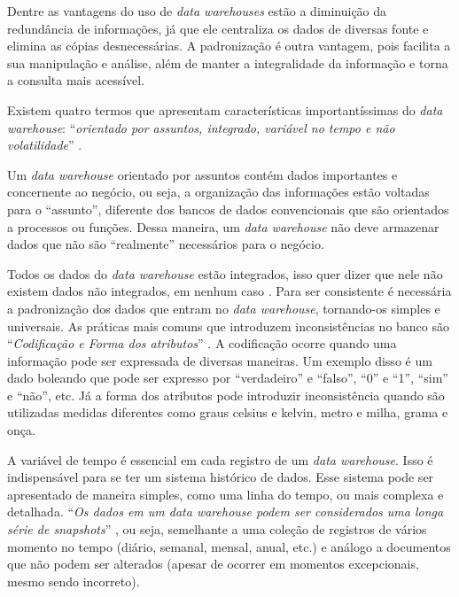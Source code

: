 Dentre as vantagens do uso de \textit{data warehouses} estão a diminuição da redundância de informações, já que ele centraliza os dados de diversas fonte e elimina as cópias desnecessárias. A padronização é outra vantagem, pois facilita a sua manipulação e análise, além de manter a integralidade da informação e torna a consulta mais acessível.

Existem quatro termos que apresentam características importantíssimas do \textit{data warehouse}: \enquote{\textit{orientado por assuntos, integrado, variável no tempo e não volatilidade}} \cite{vida2021datawarehouse}.

Um \textit{data warehouse} orientado por assuntos contém dados importantes e concernente ao negócio, ou seja, a organização das informações estão voltadas para o \enquote{assunto}, diferente dos bancos de dados convencionais que são orientados a processos ou funções. Dessa maneira, um \textit{data warehouse} não deve armazenar dados que não são \enquote{realmente} necessários para o negócio.

Todos os dados do \textit{data warehouse} estão integrados, isso quer dizer que nele não existem dados não integrados, em nenhum caso \cite{turban2009business}. Para ser consistente é necessária a padronização dos dados que entram no \textit{data warehouse}, tornando-os simples e universais. As práticas mais comuns que introduzem inconsistências no banco são \enquote{\textit{Codificação e Forma dos atributos}} \cite{vida2021datawarehouse}. A codificação ocorre quando uma informação pode ser expressada de diversas maneiras. Um exemplo disso é um dado boleando que pode ser expresso por \enquote{verdadeiro} e \enquote{falso}, \enquote{0} e \enquote{1}, \enquote{sim} e \enquote{não}, etc. Já a forma dos atributos pode introduzir inconsistência quando são utilizadas medidas diferentes como graus celsius e kelvin, metro e milha, grama e onça.

A variável de tempo é essencial em cada registro de um \textit{data warehouse}. Isso é indispensável para se ter um sistema histórico de dados. Esse sistema pode ser apresentado de maneira simples, como uma linha do tempo, ou mais complexa e detalhada. \enquote{\textit{Os dados em um data warehouse podem ser considerados uma longa série de snapshots}} \cite{boscarioli2016mineracao}, ou seja, semelhante a uma coleção de registros de vários momento no tempo (diário, semanal, mensal, anual, etc.) e análogo a documentos que não podem ser alterados (apesar de ocorrer em momentos excepcionais, mesmo sendo incorreto).

